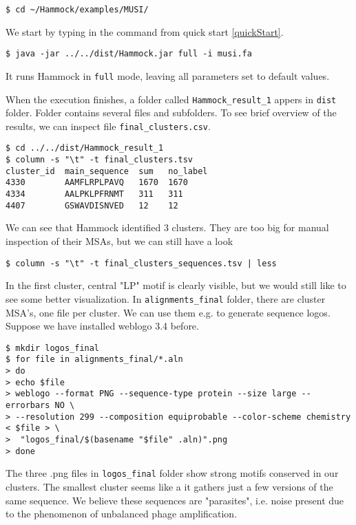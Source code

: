 \documentclass[11pt, a4paper, twoside, titlepage]{article}
\begin{document}
\noindent
\texttt{\$ cd \textasciitilde/Hammock/examples/MUSI/}\newline

We start by typing in the command from quick start \ref{quickStart}.\newline

\noindent
\texttt{\$ java -jar ../../dist/Hammock.jar full -i musi.fa}\newline

It runs Hammock in \texttt{full} mode, leaving all parameters set to default values.

When the execution finishes, a folder called \texttt{Hammock\_result\_1} appers in \texttt{dist} folder. Folder contains several files and subfolders. To see brief overview of the results, we can inspect file \texttt{final\_clusters.csv}.\newline

\begin{verbatim}
$ cd ../../dist/Hammock_result_1
$ column -s "\t" -t final_clusters.tsv
cluster_id  main_sequence  sum   no_label
4330        AAMFLRPLPAVQ   1670  1670
4334        AALPKLPFRNMT   311   311
4407        GSWAVDISNVED   12    12
\end{verbatim}

We can see that Hammock identified 3 clusters. They are too big for manual inspection of their MSAs, but we can still have a look

\begin{verbatim}
$ column -s "\t" -t final_clusters_sequences.tsv | less
\end{verbatim}

In the first cluster, central "LP" motif is clearly visible, but we would still like to see some better visualization. In \texttt{alignments\_final} folder, there are cluster MSA's, one file per cluster. We can use them e.g. to generate sequence logos. Suppose we have installed weblogo 3.4 \cite{Crooks2004} before.

\begin{verbatim}
$ mkdir logos_final
$ for file in alignments_final/*.aln
> do
> echo $file
> weblogo --format PNG --sequence-type protein --size large --errorbars NO \ 
> --resolution 299 --composition equiprobable --color-scheme chemistry < $file > \
>  "logos_final/$(basename "$file" .aln)".png
> done 
\end{verbatim}

The three .png files in \texttt{logos\_final} folder show strong motifs conserved in our clusters. The smallest cluster seems like a it gathers just a few versions of the same sequence. We believe these sequences are "parasites", i.e. noise present due to the phenomenon of unbalanced phage amplification. 
\end{document}
